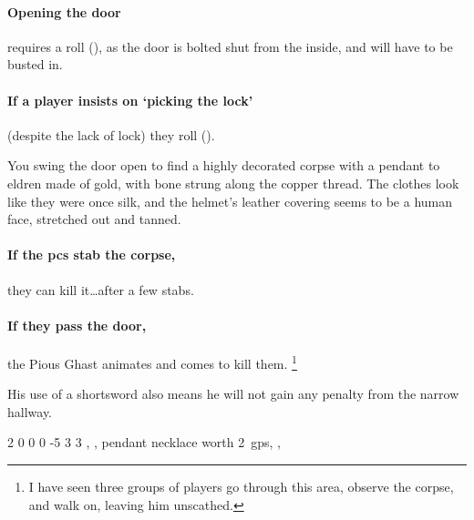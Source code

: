 \paragraph{Opening the door}
requires a  roll (\tn[14]), as the door is bolted shut from the inside, and will have to be busted in.

\paragraph{If a player insists on `picking the lock'}
(despite the lack of lock) they roll  (\tn[16]).

\begin{boxtext}

  You swing the door open to find a highly decorated corpse with a pendant to \gls{eldren} made of gold, with bone strung along the copper thread.
  The clothes look like they were once silk, and the helmet's leather covering seems to be a human face, stretched out and tanned.

\end{boxtext}

\paragraph{If the \glspl{pc} stab the corpse,}
they can kill it\ldots after a few stabs.

\paragraph{If they pass the door,}
the Pious Ghast animates and comes to kill them.%
\footnote{I have seen three groups of players go through this area, observe the corpse, and walk on, leaving him unscathed.}

His use of a shortsword also means he will not gain any penalty from the narrow hallway.


  {2}%
  {0}%
  {{0}%
  {0}%
  {-5}}%
  {3}%
  {3}%
  {}%
  {\shortsword, \completeplate, pendant necklace worth 2~\glspl{gp}, \lootJewellery, \lootJewellery}%
  {
    \setcounter{Academics}{1}
    \setcounter{Stealth}{2}
    \setcounter{Tactics}{2}
    \setcounter{Vigilance}{1}
    \undead
  }


